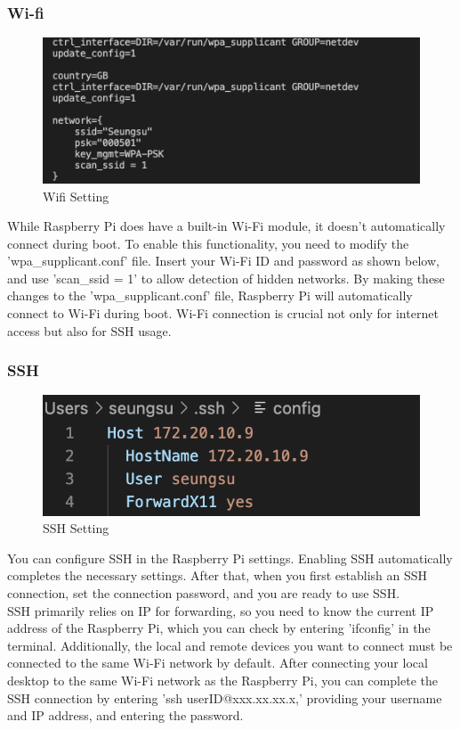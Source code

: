 \subsubsection{\textbf{Wi-fi}}
\begin{figure}[h]
    \centering
    \includegraphics[width=0.5\linewidth]{images/wifi.png}
    \caption{Wifi Setting}
    \label{fig:enter-label}
\end{figure}
While Raspberry Pi does have a built-in Wi-Fi module, it doesn't automatically connect during boot. To enable this functionality, you need to modify the 'wpa\_supplicant.conf' file. Insert your Wi-Fi ID and password as shown below, and use 'scan\_ssid = 1' to allow detection of hidden networks. By making these changes to the 'wpa\_supplicant.conf' file, Raspberry Pi will automatically connect to Wi-Fi during boot. Wi-Fi connection is crucial not only for internet access but also for SSH usage.\\

\subsubsection{\textbf{SSH}}
\begin{figure}[h]
    \centering
    \includegraphics[width=0.5\linewidth]{images/ssh.png}
    \caption{SSH Setting}
    \label{fig:enter-label}
\end{figure}
You can configure SSH in the Raspberry Pi settings. Enabling SSH automatically completes the necessary settings. After that, when you first establish an SSH connection, set the connection password, and you are ready to use SSH.
\\

SSH primarily relies on IP for forwarding, so you need to know the current IP address of the Raspberry Pi, which you can check by entering 'ifconfig' in the terminal. Additionally, the local and remote devices you want to connect must be connected to the same Wi-Fi network by default.
After connecting your local desktop to the same Wi-Fi network as the Raspberry Pi, you can complete the SSH connection by entering 'ssh userID@xxx.xx.xx.x,' providing your username and IP address, and entering the password.\\

